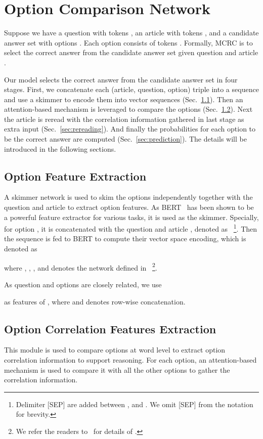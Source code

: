 \documentclass[11pt,a4paper]{article}
\begin{document}
\section{Option Comparison Network}


Suppose we have a question  with  tokens , an article  with  tokens , and a candidate answer set  with  options . Each option  consists of  tokens .
Formally, MCRC is to select the correct answer  from the candidate answer set  given question  and article .

Our model selects the correct answer from the candidate answer set in four stages. First, we concatenate each (article, question, option) triple into a sequence and use a skimmer to encode them into vector sequences (Sec.~\ref{sec:encoding}). Then an attention-based mechanism is leveraged to compare the options (Sec.~\ref{sec:comparison}). Next the article is reread with the correlation information gathered in last stage as extra input (Sec.~\ref{sec:rereading}). And finally the probabilities for each option to be the correct answer are computed (Sec.~\ref{sec:prediction}). The details will be introduced in the following sections.

\subsection{Option Feature Extraction}
\label{sec:encoding}
A skimmer network is used to skim the options independently together with the question and article to extract option features.
As BERT~\cite{BERT} has been shown to be a powerful feature extractor for various tasks, it is used as the skimmer. Specially, for option , it is concatenated with the question  and article , denoted as ~\footnote{Delimiter [SEP] are added between ,  and . We omit [SEP] from the notation for brevity.}. Then the sequence is fed to BERT to compute their vector space encoding, which is denoted as 

where , , , and  denotes the network defined in~\cite{BERT} \footnote{We refer the readers to~\cite{BERT} for details of .}. 

As question and options are closely related, we use

as features of , where  and  denotes row-wise concatenation.


\subsection{Option Correlation Features Extraction}
\label{sec:comparison}
This module is used to compare options at word level to extract option correlation information to support reasoning. For each option, an attention-based mechanism is used to compare it with all the other options to gather the correlation information.
\end{document}

